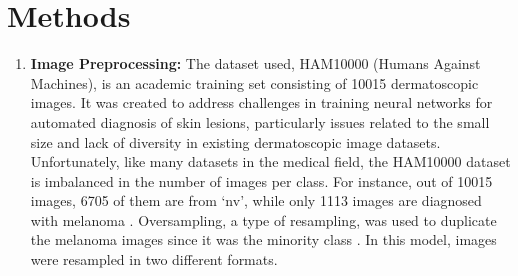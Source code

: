 \documentclass[10pt,twocolumn]{article}
\begin{document}
\section{Methods}
\begin{enumerate}
    \item \textbf{Image Preprocessing:} The dataset used, HAM10000 (Humans Against Machines), is an academic training set consisting of 10015 dermatoscopic images. It was created to address challenges in training neural networks for automated diagnosis of skin lesions, particularly issues related to the small size and lack of diversity in existing dermatoscopic image datasets. \newline \newline
    Unfortunately, like many datasets in the medical field, the HAM10000 dataset is imbalanced in the number of images per class. For instance, out of 10015 images, 6705 of them are from ‘nv’, while only 1113 images are diagnosed with melanoma \cite{tschandl2018ham10000}. Oversampling, a type of resampling, was used to duplicate the melanoma images since it was the minority class \cite{KDnuggets}. In this model, images were resampled in two different formats. \newline


\end{enumerate}
\end{document}
